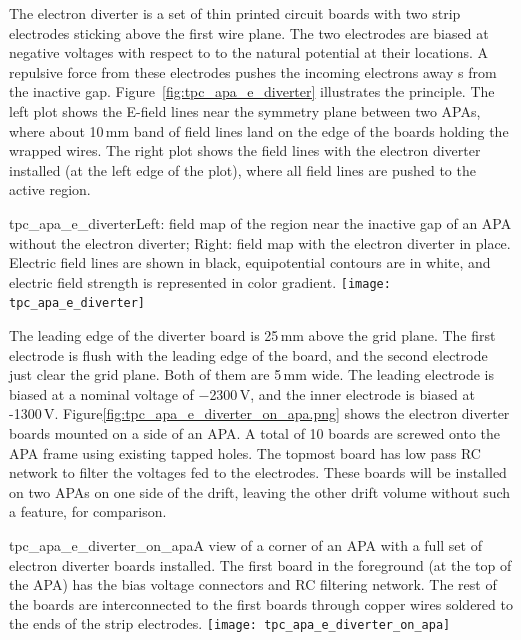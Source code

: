 The electron diverter is a set of thin printed circuit boards with two strip electrodes sticking above the first wire plane.  The two electrodes are biased at %
negative voltages with respect to to the natural potential at their locations.  A repulsive force from these electrodes pushes the incoming electrons away s%
from the inactive gap.  Figure~\ref{fig:tpc_apa_e_diverter} illustrates the principle. The left plot shows the E-field lines near the symmetry plane between two APAs, where about 10\,mm band of field lines land on the edge of the boards holding the wrapped wires.  The right plot shows the field lines with the electron diverter installed (at the left edge of the plot), where all field lines are pushed to the active region.

\begin{cdrfigure}{tpc_apa_e_diverter}{Left: field map of the region near the inactive gap of an APA without the electron diverter; Right: field map with the electron diverter in place.
Electric field lines are shown in black, equipotential contours are in white, and electric field strength is represented in color gradient.}
\texttt{[image: tpc\_apa\_e\_diverter]} 
\end{cdrfigure}

 
The leading edge of the diverter board is 25\,mm above the grid plane.  The first electrode is flush with the leading edge of the board, and the second electrode just clear the grid plane.  Both of them are 5\,mm wide.  The leading electrode is biased at a nominal voltage of $-$2300\,V, and the inner electrode is biased at -1300\,V.     Figure\ref{fig:tpc_apa_e_diverter_on_apa.png} shows the electron diverter boards mounted on a side of an APA.  A total of 10 boards are screwed onto the APA frame using existing tapped holes.  The topmost board has low pass RC network to filter the voltages fed to the electrodes.  These boards will be installed on two APAs on one side of the drift, leaving the other drift volume without such a feature, for comparison.
 
 \begin{cdrfigure}[]{tpc_apa_e_diverter_on_apa}{A view of a corner of an APA with a full set of electron diverter boards installed.  The first board in the foreground (at the top of the APA) has the bias voltage connectors and RC filtering network.  The rest of the boards are interconnected to the first boards through copper wires soldered to the ends of the strip electrodes.}
\texttt{[image: tpc\_apa\_e\_diverter\_on\_apa]} 
\end{cdrfigure}



